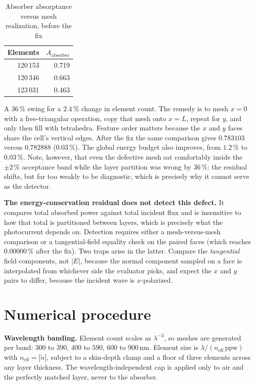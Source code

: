\documentclass[lettersize,journal,onecolumn]{IEEEtran}
\begin{document}
\begin{table}[!ht]
\caption{Absorber absorptance versus mesh realization, before the fix}
\centering\small
\begin{tabular}{rr}
\toprule
Elements & $A_\mathrm{absorber}$ \\
\midrule
120\,153 & 0.719 \\
120\,346 & 0.663 \\
123\,031 & 0.463 \\
\bottomrule
\end{tabular}
\end{table}

A $36\,\%$ swing for a $2.4\,\%$ change in element count. The remedy is to
mesh $x=0$ with a free-triangular operation, copy that mesh onto $x=L$, repeat
for $y$, and only then fill with tetrahedra. Feature order matters because the
$x$ and $y$ faces share the cell's vertical edges. After the fix the same
comparison gives $0.783103$ versus $0.782888$ ($0.03\,\%$). The global
energy budget also improves, from $1.2\,\%$ to $0.03\,\%$. Note, however, that
even the defective mesh sat comfortably inside the $\pm2\,\%$ acceptance
band while the layer partition was wrong by $36\,\%$: the residual shifts,
but far too weakly to be diagnostic, which is precisely why it cannot serve
as the detector.

\textbf{The energy-conservation residual does not detect this defect.} It
compares total absorbed power against total incident flux and is insensitive
to how that total is partitioned between layers, which is precisely what the
photocurrent depends on. Detection requires either a mesh-versus-mesh
comparison or a tangential-field equality check on the paired faces (which
reaches $0.00000\,\%$ after the fix). Two traps arise in the latter. Compare
the \emph{tangential} field components, not $|E|$, because the normal
component sampled on a face is interpolated from whichever side the evaluator
picks, and expect the $x$ and $y$ pairs to differ, because the incident wave
is $x$-polarized.

\section{Numerical procedure}
\textbf{Wavelength banding.} Element count scales as $\lambda^{-3}$, so meshes
are generated per band: $300$ to $390$, $400$ to $590$, $600$ to $900\,$nm. Element
size is $\lambda/(n_\mathrm{eff}\,\mathrm{ppw})$ with
$n_\mathrm{eff}=|\tilde{n}|$, subject to a skin-depth clamp and a floor of
three elements across any layer thickness. The wavelength-independent cap is
applied only to air and the perfectly matched layer, never to the absorber.
\end{document}
